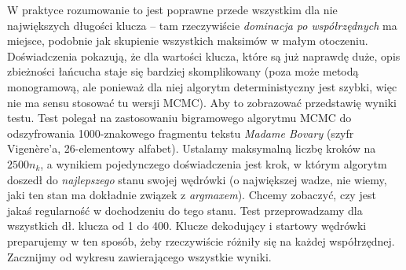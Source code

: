 \documentclass[a4paper]{article}
\theoremstyle{defn}
\theoremstyle{theorem}
\theoremstyle{lemma}
\theoremstyle{cor}
\theoremstyle{fact}
\begin{document}
W praktyce rozumowanie to jest poprawne przede wszystkim dla nie największych długości klucza – tam rzeczywiście \textit{dominacja po współrzędnych} ma miejsce, podobnie jak skupienie wszystkich maksimów w małym otoczeniu. Doświadczenia pokazują, że dla wartości klucza, które są już naprawdę duże, opis zbieżności łańcucha staje się bardziej skomplikowany (poza może metodą monogramową, ale ponieważ dla niej algorytm deterministyczny jest szybki, więc nie ma sensu stosować tu wersji MCMC). Aby to zobrazować przedstawię wyniki testu. Test polegał na zastosowaniu bigramowego algorytmu MCMC do odszyfrowania 1000-znakowego fragmentu tekstu  \textit{Madame Bovary} \cite{gutenberg} (szyfr Vigenère'a, 26-elementowy alfabet). Ustalamy maksymalną liczbę kroków na $2500n_k$, a wynikiem pojedynczego doświadczenia jest krok, w którym algorytm doszedł do \textit{najlepszego} stanu swojej wędrówki (o największej wadze, nie wiemy, jaki ten stan ma dokładnie związek z \textit{argmaxem}). Chcemy zobaczyć, czy jest jakaś regularność w dochodzeniu do tego stanu. Test przeprowadzamy dla wszystkich dł. klucza od 1 do 400. Klucze dekodujący i startowy wędrówki preparujemy w ten sposób, żeby rzeczywiście różniły się na każdej współrzędnej. Zacznijmy od wykresu zawierającego wszystkie wyniki.
\end{document}
